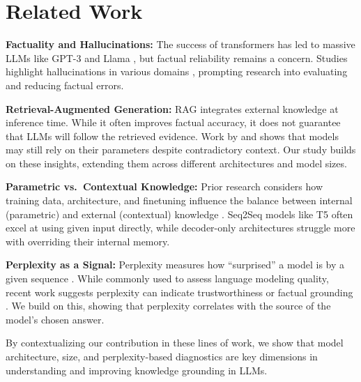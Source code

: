 \section{Related Work}

\textbf{Factuality and Hallucinations:}
The success of transformers \citep{attention_is_all_you_need} has led to massive LLMs like GPT-3 \citep{gpt3} and Llama \citep{llama}, but factual reliability remains a concern. Studies highlight hallucinations in various domains \citep{how_can_we_know,can_rag_models_reason,gpt2}, prompting research into evaluating and reducing factual errors.

\textbf{Retrieval-Augmented Generation:}
RAG \citep{rag,atlas_foundational,retro} integrates external knowledge at inference time. While it often improves factual accuracy, it does not guarantee that LLMs will follow the retrieved evidence. Work by \citet{ragged} and \citet{factual_recall} shows that models may still rely on their parameters despite contradictory context. Our study builds on these insights, extending them across different architectures and model sizes.

\textbf{Parametric vs.\ Contextual Knowledge:}
Prior research considers how training data, architecture, and finetuning influence the balance between internal (parametric) and external (contextual) knowledge \citep{factual_recall,knowledge_grounding_retrieval_augmented}. Seq2Seq models like T5 \citep{t5,flant5} often excel at using given input directly, while decoder-only architectures struggle more with overriding their internal memory.

\textbf{Perplexity as a Signal:}
Perplexity measures how “surprised” a model is by a given sequence \citep{how_can_we_know}. While commonly used to assess language modeling quality, recent work suggests perplexity can indicate trustworthiness or factual grounding \citep{learning_the_difference}. We build on this, showing that perplexity correlates with the source of the model’s chosen answer.

By contextualizing our contribution in these lines of work, we show that model architecture, size, and perplexity-based diagnostics are key dimensions in understanding and improving knowledge grounding in LLMs.

